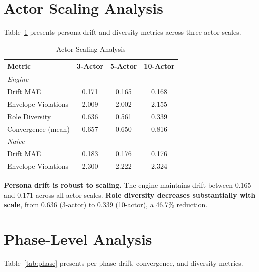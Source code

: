 \documentclass[12pt, a4paper]{report}
\begin{document}
\section{Actor Scaling Analysis}

Table~\ref{tab:scaling} presents persona drift and diversity metrics across three actor scales.

\begin{table}[t]
\centering
\caption{Actor Scaling Analysis}
\label{tab:scaling}
\begin{tabular}{lccc}
\toprule
Metric & 3-Actor & 5-Actor & 10-Actor \\
\midrule
\multicolumn{4}{l}{\textit{Engine}} \\
Drift MAE          & 0.171 & \cellcolor{better} 0.165 & 0.168 \\
Envelope Violations & 2.009 & \cellcolor{better} 2.002 & 2.155 \\
Role Diversity      & \cellcolor{better} 0.636 & 0.561 & 0.339 \\
Convergence (mean)  & 0.657 & \cellcolor{better} 0.650 & 0.816 \\
\midrule
\multicolumn{4}{l}{\textit{Naive}} \\
Drift MAE          & 0.183 & \cellcolor{better} 0.176 & \cellcolor{better} 0.176 \\
Envelope Violations & 2.300 & \cellcolor{better} 2.222 & 2.324 \\
\bottomrule
\end{tabular}
\end{table}

\textbf{Persona drift is robust to scaling.} The engine maintains drift between 0.165 and 0.171 across all actor scales. \textbf{Role diversity decreases substantially with scale}, from 0.636 (3-actor) to 0.339 (10-actor), a 46.7\% reduction.


\section{Phase-Level Analysis}

Table~\ref{tab:phase} presents per-phase drift, convergence, and diversity metrics.
\end{document}

